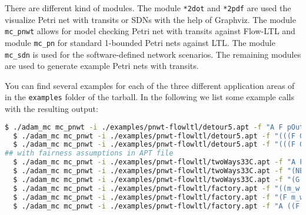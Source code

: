 \documentclass[12pt,twoside,a4paper,openright]{memoir}
\begin{document}
There are different kind of modules.
The module \texttt{*2dot} and \texttt{*2pdf} are
used the visualize Petri net with transits or SDNs with the help of Graphviz.
The module \texttt{mc\_pnwt} allows for model checking Petri net with transits against Flow-LTL
and module \texttt{mc\_pn} for standard 1-bounded Petri nets against LTL.
The module \texttt{mc\_sdn} is used for the software-defined network scenarios.
The remaining modules are used to generate example Petri nets with transits.  

You can find several examples for each of the three different 
application areas of \tool{} in the \texttt{examples} folder of the tarball.
In the following we list some example calls
with the resulting output:
\begin{lstlisting}[captionpos=b, caption=Example calls for checking Petri nets with transits against Flow-LTL., label=lst:pnwtFlow-LTLEx, language=bash,breaklines=true]
  $ ./adam_mc mc_pnwt -i ./examples/pnwt-flowltl/detour5.apt -f "A F pOut"  # UNSAT
  $ ./adam_mc mc_pnwt -i ./examples/pnwt-flowltl/detour5.apt -f "(((F G (p2 AND (pup AND pIn)) IMP G F tup) AND ((F G (pOut AND p3) IMP G F t4) AND ((F G (p3 AND p2) IMP G F t3) AND ((F G (p1 AND pIn) IMP G F t0) AND (F G (p1 AND p2) IMP G F t2))))) IMP A F pOut)"  # SAT 
  $ ./adam_mc mc_pnwt -i ./examples/pnwt-flowltl/detour5.apt -f "(((F G (p2 AND (pup AND pIn)) IMP G F tup) AND ((F G (pOut AND p3) IMP G F t4) AND ((F G (p3 AND p2) IMP G F t3) AND ((F G (p1 AND pIn) IMP G F t0) AND (F G (p1 AND p2) IMP G F t2))))) IMP A F pOut)" -app seqIn # SAT 
## with fairness assumptions in APT file
  $ ./adam_mc mc_pnwt -i ./examples/pnwt-flowltl/twoWays33C.apt -f "A F out" -app parIn -v # UNSAT
  $ ./adam_mc mc_pnwt -i ./examples/pnwt-flowltl/twoWays33C.apt -f "(NEG G F (tupD OR tupU) IMP A F out)" -app parIn -cr_abc # SAT
  $ ./adam_mc mc_pnwt -i ./examples/pnwt-flowltl/twoWays33C.apt -f "(G F createFlows IMP (NEG G F (tupD OR tupU) IMP A F out))" -app parIn -max NONE # SAT
  $ ./adam_mc mc_pnwt -i ./examples/pnwt-flowltl/factory.apt -f "((m_w AND m_i) IMP A ((G NEG F db_w AND F sdb_1) AND F vA_w))" -app parIn -stuck GFo # SAT
  $ ./adam_mc mc_pnwt -i ./examples/pnwt-flowltl/factory.apt -f "(F m_w AND db_w)" -app parIn -max IntC -veri "IC3|BMC2|BMC3" -stats "" # UNSAT
  $ ./adam_mc mc_pnwt -i ./examples/pnwt-flowltl/factory.apt -f "A ((F m_w AND F db_w) AND F vA_w)" -app parIn -max IntC # SAT
\end{lstlisting}
\end{document}
